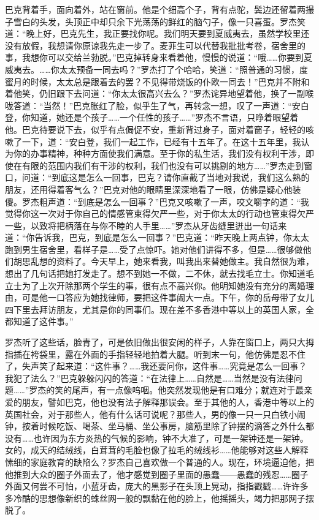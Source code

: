 \par 巴克背着手，面向着外，站在窗前。他是个细高个子，背有点驼，鬓边还留着两撮子雪白的头发，头顶正中却只余下光荡荡的鲜红的脑勺子，像一只喜蛋。罗杰笑道：“晚上好，巴克先生，我正要找你呢。我们明天要到夏威夷去，虽然学校里还没有放假，我想请你原谅我先走一步了。麦菲生可以代替我批批考卷，宿舍里的事，我想你可以交给兰勃脱。”巴克掉转身来看着他，慢慢的说道：“哦……你要到夏威夷去。……你太太预备一同去吗？”罗杰打了个哈哈，笑道：“照普通的习惯，度蜜月的时候，太太总是跟着去的罢？不见得带烧饭的仆欧一同去！”巴克并不附和着他笑，仍旧跟下去问道：“你太太很高兴去么？”罗杰诧异地望着他，换了一副喉咙答道：“当然！”巴克胀红了脸，似乎生了气，再转念一想，叹了一声道：“安白登，你知道，她还是个孩子……一个任性的孩子……”罗杰不言语，只睁着眼望着他。巴克待要说下去，似乎有点侷促不安，重新背过身子，面对着窗子，轻轻的咳嗽了一下，道：“安白登，我们一起工作，已经有十五年了。在这十五年里，我认为你的办事精神，种种方面使我们满意。至于你的私生活，我们没有权利干涉，即使在有限的范围内我们有干涉的权利，我们也没有可以挑剔的地方……”罗杰走到窗口，问道：“到底这是怎么一回事，巴克？请你直截了当地对我说，我们这么熟的朋友，还用得着客气么？”巴克对他的眼睛里深深地看了一眼，仿佛是疑心他装傻。罗杰粗声道：“到底是怎么一回事？”巴克又咳嗽了一声，咬文嚼字的道：“我觉得你这一次对于你自己的情感管束得欠严一些，对于你太太的行动也管束得欠严一些，以致将把柄落在与你不睦的人手里……”罗杰从牙齿缝里迸出一句话来道：“你告诉我，巴克，到底是怎么一回事？”巴克道：“昨天晚上两点钟，你太太跑到男生宿舍里，看样子是……受了点惊吓。她对他们讲得不多，但是……很够做他们胡思乱想的资料了。今天早上，她来看我，叫我出来替她做主。我自然很为难，想出了几句话把她打发走了。想不到她一不做，二不休，就去找毛立士。你知道毛立士为了上次开除那两个学生的事，很有点不高兴你。他明知她没有充分的离婚理由，可是他一口答应为她找律师，要把这件事闹大一点。下午，你的岳母带了女儿四下里去拜访朋友，尤其是你的同事们。现在差不多香港中等以上的英国人家，全都知道了这件事。”
\par 罗杰听了这些话，脸青了，可是依旧做出很安闲的样子，人靠在窗口上，两只大拇指插在袴袋里，露在外面的手指轻轻地拍着大腿。听到末一句，他仿佛是忍不住了，失声笑了起来道：“这件事？……我还要问你，这件事……究竟是怎么一回事？我犯了法么？”巴克躲躲闪闪的答道：“在法律上……自然是……当然是没有法律问题……”罗杰的笑的尾声，有一点像呜咽。他突然发现他是有口难分；就连对于最亲爱的朋友，譬如巴克，他也没有法子解释那误会。至于其他的人，香港中等以上的英国社会，对于那些人，他有什么话可说呢？那些人，男的像一只一只白铁小闹钟，按着时候吃饭、喝茶、坐马桶、坐公事房，脑筋里除了钟摆的滴答之外什么都没有……也许因为东方炎热的气候的影响，钟不大准了，可是一架钟还是一架钟。女的，成天的结绒线，白茸茸的毛脸也像了拉毛的绒线衫……他能够对这些人解释愫细的家庭教育的缺陷么？罗杰自己喜欢做一个普通的人。现在，环境逼迫他，把他推到大众的圈子外面去了，他才感觉到圈子里面的愚蠢——愚蠢的残忍……圈子外面又何尝不可怕，小蓝牙齿，庞大的黑影子在头顶上晃动，指指戳戳……许许多多冷酷的思想像新织的蛛丝网一般的飘黏在他的脸上，他摇摇头，竭力把那网子摆脱了。
